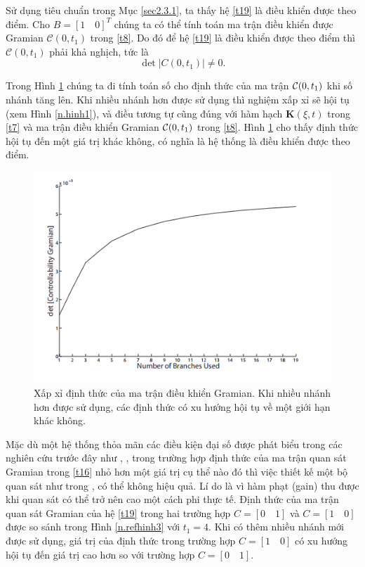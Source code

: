 \begin{vd}
Sử dụng tiêu chuẩn trong Mục \ref{sec2.3.1}, ta thấy hệ \eqref{t19} là điều khiển được theo điểm. Cho $B=[1\quad 0]^T$ chúng ta có thể tính toán ma trận điều khiển được Gramian $\mathcal{C}(0,t_1)$ trong \eqref{t8}. 
Do đó để hệ \eqref{t19} là điều khiển được theo điểm thì $\mathcal{C}(0,t_1)$ phải khả nghịch, tức là 
%
\begin{equation}\label{t20}
\det|C(0,t_1)| \not= 0.
\end{equation} 

Trong Hình \ref{n.refhinh2} chúng ta đi tính toán số cho định thức của ma trận $\mathcal{C}(0,t_1)$ khi số nhánh tăng lên. Khi nhiều nhánh hơn được sử dụng thì nghiệm xấp xỉ sẽ hội tụ (xem Hình \ref{n.hinh1}), và điều tương tự cũng đúng với hàm hạch $\mathbf{K}(\xi,t)$ trong \eqref{t7} và ma trận điều khiển Gramian $\mathcal{C}(0,t_1)$ trong \eqref{t8}. Hình \ref{n.refhinh2} cho thấy định thức hội tụ đến một giá trị khác không, có nghĩa là hệ thống là điều khiển được theo điểm.
%    
\begin{figure}[t]
	\centering
	\includegraphics[width=0.7\linewidth]{hinh/hinh2n}
	\caption{Xấp xỉ định thức của ma trận điều khiển Gramian. Khi nhiều nhánh hơn được sử dụng, các định thức có xu hướng hội tụ về một giới hạn khác không.}
	\label{n.refhinh2}
\end{figure}   
%

Mặc dù một hệ thống thỏa mãn các điều kiện đại số được phát biểu trong các nghiên cứu trước đây như \cite{LeeOl81}, \cite{Mal87}, trong trường hợp định thức của ma trận quan sát Gramian trong \eqref{t16} nhỏ hơn một giá trị cụ thể nào đó thì việc thiết kế một bộ quan sát như trong \cite{LeeOl81}, \cite{Mal87}
có thể không hiệu quả. Lí do là vì hàm phạt (gain) thu được khi quan sát có thể trở nên cao một cách phi thực tế. Định thức của ma trận quan sát Gramian của hệ \eqref{t19} trong hai trường hợp $C=[0\quad 1]$ và $C=[1\quad 0]$ được so sánh trong Hình \ref{n.refhinh3} với $t_1=4$. Khi có thêm nhiều nhánh mới được sử dụng, giá trị của định thức trong trường hợp $C=[1\quad 0]$ có xu hướng hội tụ đến giá trị cao hơn so với trường hợp $C=[0 \quad 1]$.


\end{vd}
